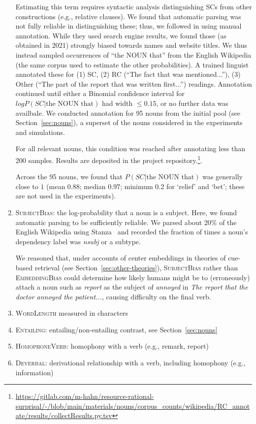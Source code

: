 \begin{enumerate}
Estimating this term requires syntactic analysis distinguishing SCs from other constructions (e.g., relative clauses).
We found that automatic parsing was not fully reliable in distinguishing these; thus, we followed \citet{Staub2018RelativeCA} in using manual annotation.
While they used search engine results, we found those (as obtained in 2021) strongly biased towards names and website titles.
We thus instead sampled occurrences of ``the NOUN that'' from the English Wikipedia (the same corpus used to estimate the other probabilities).
A trained linguist annotated these for (1) SC, (2) RC (``The fact that was mentioned...''), (3) Other (``The part of the report that was written first...'') readings.
Annotation continued until either a Binomial confidence interval for $log P(SC|\text{the NOUN that})$ had width $\leq 0.15$, or no further data was availbale.
We conducted annotation for 95 nouns from the initial pool (see Section~\ref{sec:nouns}), a superset of the nouns considered in the experiments and simulations.

For all relevant nouns, this condition was reached after annotating less than 200 samples.
		Results are deposited in the project repository.\footnote{\url{https://gitlab.com/m-hahn/resource-rational-surprisal/-/blob/main/materials/nouns/corpus_counts/wikipedia/RC_annotate/results/collectResults.py.tsv}}.

Across the 95 nouns, we found that $P(SC|\text{the NOUN that})$ was generally close to $1$ (mean 0.88; median 0.97; minimum 0.2 for `relief' and `bet'; these are not used in the experiments). 



\item \textsc{SubjectBias}: the log-probability that a noun is a subject.
	Here, we found automatic parsing to be sufficiently reliable.
		We parsed about 20\% of the English Wikipedia using Stanza~\citep{Qi2020StanzaAP} and recorded the fraction of times a noun's dependency label was \textit{nsubj} or a subtype.

		We reasoned that, under accounts of center embeddings in theories of cue-based retrieval (see Section~\ref{sec:other-theories}), \textsc{SubjectBias} rather than \textsc{EmbeddingBias} could determine how likely humans might be to (erroneously) attach a noun such as \textit{report} as the subject of \textit{annoyed} in \textit{The report that the doctor annoyed the patient...}, causing difficulty on the final verb.

	\item \textsc{WordLength} measured in characters

	\item \textsc{Entailing}: entailing/non-entailing contrast, see Section~\ref{sec:nouns}

	\item \textsc{HomophoneVerb}: homophony with a verb (e.g., remark, report)
	
	\item \textsc{Deverbal}: derivational relationship with a verb, including homophony (e.g., information)
\end{enumerate}


